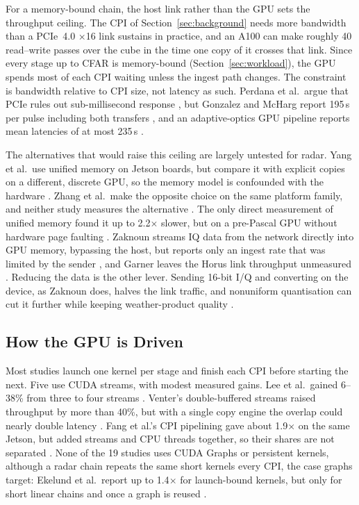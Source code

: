 For a memory-bound chain, the host link rather than the GPU sets the throughput ceiling.
The CPI of Section~\ref{sec:background} needs more bandwidth than a PCIe~4.0 ×16 link sustains in practice,
and an A100 can make roughly 40 read--write passes over the cube in the time one copy of it crosses that link.
Since every stage up to CFAR is memory-bound (Section~\ref{sec:workload}),
the GPU spends most of each CPI waiting unless the ingest path changes.
The constraint is bandwidth relative to CPI size, not latency as such.
Perdana et al.\ argue that PCIe rules out sub-millisecond response \cite{perdanaSurveyGraphicsProcessing2017},
but Gonzalez and McHarg report 195\,\textmu s per pulse including both transfers \cite{gonzalezCUDALibraryT2OURNAMINT},
and an adaptive-optics GPU pipeline reports mean latencies of at most 235\,\textmu s \cite{ferreiraHardRealtimeCore2020a}.

The alternatives that would raise this ceiling are largely untested for radar.
Yang et al.\ use unified memory on Jetson boards,
but compare it with explicit copies on a different, discrete GPU, so the memory model is confounded with the hardware \cite{yangDistributedRealTimeImage2022a}.
Zhang et al.\ make the opposite choice on the same platform family, and neither study measures the alternative \cite{zhangNearRealTimeImagingAlgorithm2025a}.
The only direct measurement of unified memory found it up to 2.2$\times$ slower,
but on a pre-Pascal GPU without hardware page faulting \cite{landaverdeInvestigationUnifiedMemory2014}.
Zaknoun streams IQ data from the network directly into GPU memory, bypassing the host,
but reports only an ingest rate that was limited by the sender \cite{zaknounRealTimeGPUacceleratedProcessing},
and Garner leaves the Horus link throughput unmeasured \cite{garnerTRADESPACEANALYSISHETEROGENEOUS2026}.
Reducing the data is the other lever.
Sending 16-bit I/Q and converting on the device, as Zaknoun does, halves the link traffic,
and nonuniform quantisation can cut it further while keeping weather-product quality \cite{uekiDataChallengeFully2025}.

\subsection{How the GPU is Driven}
\label{sec:execution}
Most studies launch one kernel per stage and finish each CPI before starting the next.
Five use CUDA streams, with modest measured gains.
Lee et al.\ gained 6--38\% from three to four streams \cite{leeArchitectureExplorationBackprojection2021a}. Venter's double-buffered streams raised throughput by more than 40\%, but with a single copy engine the overlap could nearly double latency \cite{venterSOFTWAREDEFINEDPULSEDOPPLERRADAR}. Fang et al.'s CPI pipelining gave about 1.9$\times$ on the same Jetson, but added streams and CPU threads together, so their shares are not separated \cite{fangRealtimeImplementationPhased2024}.
None of the 19 studies uses CUDA Graphs or persistent kernels,
although a radar chain repeats the same short kernels every CPI, the case graphs target:
Ekelund et al.\ report up to 1.4$\times$ for launch-bound kernels,
but only for short linear chains and once a graph is reused \cite{ekelundBoostingPerformanceIterative2025a}.

